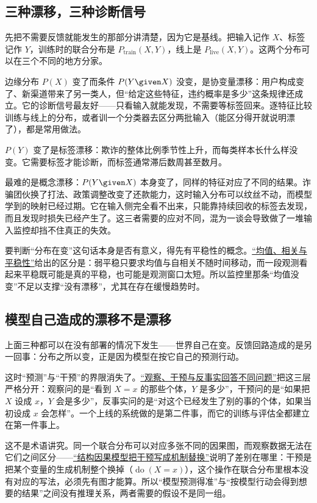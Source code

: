 \subsection{三种漂移，三种诊断信号}

先把不需要反馈就能发生的那部分讲清楚，因为它是基线。把输入记作 \(X\)、标签记作 \(Y\)，训练时的联合分布是 \(P_{\text{train}}(X,Y)\)，线上是 \(P_{\text{live}}(X,Y)\)。这两个分布可以在三个不同的地方分家。

边缘分布 \(P(X)\) 变了而条件 \(P(Y\given X)\) 没变，是协变量漂移：用户构成变了、新渠道带来了另一类人，但``给定这些特征，违约概率是多少''这条规律还成立。它的诊断信号最友好——只看输入就能发现，不需要等标签回来。逐特征比较训练与线上的分布，或者训一个分类器去区分两批输入（能区分得开就说明漂了），都是常用做法。

\(P(Y)\) 变了是标签漂移：欺诈的整体比例季节性上升，而每类样本长什么样没变。它需要标签才能诊断，而标签通常滞后数周甚至数月。

最难的是概念漂移：\(P(Y\given X)\) 本身变了，同样的特征对应了不同的结果。诈骗团伙换了打法、政策调整改变了还款能力，这时输入分布可以纹丝不动，而模型学到的映射已经过期。它在输入侧完全看不出来，只能靠持续回收的标签去发现，而且发现时损失已经产生了。这三者需要的应对不同，混为一谈会导致做了一堆输入监控却挡不住真正的失效。

要判断``分布在变''这句话本身是否有意义，得先有平稳性的概念。\hyperref[sec:06-Random-Processes/01-Foundations/03]{``均值、相关与平稳性''}给出的区分是：弱平稳只要求均值与自相关不随时间移动，而一段观测看起来平稳既可能是真的平稳，也可能是观测窗口太短。所以监控里那条``均值没变''不足以支撑``没有漂移''，尤其在存在缓慢趋势时。

\subsection{模型自己造成的漂移不是漂移}

上面三种都可以在没有部署的情况下发生——世界自己在变。反馈回路造成的是另一回事：分布之所以变，正是因为模型在按它自己的预测行动。

这时``预测''与``干预''的界限消失了。\hyperref[sec:13-Machine-Learning/12-Causal-Inference/01]{``观察、干预与反事实回答不同问题''}把这三层严格分开：观察问的是``看到 \(X=x\) 的那些个体，\(Y\) 是多少''，干预问的是``如果把 \(X\) 设成 \(x\)，\(Y\) 会是多少''，反事实问的是``对这个已经发生了别的事的个体，如果当初设成 \(x\) 会怎样''。一个上线的系统做的是第二件事，而它的训练与评估全都建立在第一件事上。

这不是术语讲究。同一个联合分布可以对应多张不同的因果图，而观察数据无法在它们之间区分——\hyperref[sec:13-Machine-Learning/12-Causal-Inference/02]{``结构因果模型把干预写成机制替换''}说明了差别在哪里：干预是把某个变量的生成机制整个换掉（\(\operatorname{do}(X=x)\)），这个操作在联合分布里根本没有对应的写法，必须先有图才能算。所以``模型预测得准''与``按模型行动会得到想要的结果''之间没有推理关系，两者需要的假设不是同一组。

